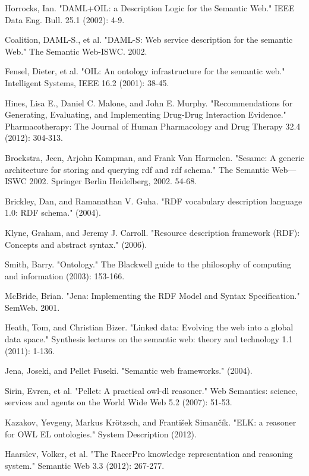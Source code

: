 \documentclass{article}
\begin{document}
\begin{thebibliography}{9}
  Horrocks, Ian. 
  "DAML+OIL: a Description Logic for the Semantic Web." 
  IEEE Data Eng. Bull. 25.1 
  (2002): 4-9.

  Coalition, DAML-S., et al. 
  "DAML-S: Web service description for the semantic Web." 
  The Semantic Web-ISWC. 2002.

  Fensel, Dieter, et al. 
  "OIL: An ontology infrastructure for the semantic web."
  Intelligent Systems, IEEE 16.2 
  (2001): 38-45.

  Hines, Lisa E., Daniel C. Malone, and John E. Murphy. "Recommendations for
  Generating, Evaluating, and Implementing Drug‐Drug Interaction Evidence."
  Pharmacotherapy: The Journal of Human Pharmacology and Drug Therapy 32.4
  (2012): 304-313.

Broekstra, Jeen, Arjohn Kampman, and Frank Van Harmelen. "Sesame: A generic
architecture for storing and querying rdf and rdf schema." The Semantic Web—ISWC
2002. Springer Berlin Heidelberg, 2002. 54-68.

  Brickley, Dan, and Ramanathan V. Guha. 
  "RDF vocabulary description language 1.0: RDF schema." 
  (2004).

  Klyne, Graham, and Jeremy J. Carroll. 
  "Resource description framework (RDF): Concepts and abstract syntax." 
  (2006).

  Smith, Barry. 
  "Ontology." 
  The Blackwell guide to the philosophy of computing and information 
  (2003): 153-166.

  McBride, Brian. 
  "Jena: Implementing the RDF Model and Syntax Specification."
  SemWeb. 
  2001.

  Heath, Tom, and Christian Bizer. 
  "Linked data: Evolving the web into a global data space." 
  Synthesis lectures on the semantic web: theory and technology 1.1
  (2011): 1-136.

  Jena, Joseki, and Pellet Fuseki. 
  "Semantic web frameworks." 
  (2004).

  Sirin, Evren, et al. "Pellet: A practical owl-dl reasoner." Web Semantics:
  science, services and agents on the World Wide Web 5.2 (2007): 51-53.

  Kazakov, Yevgeny, Markus Krötzsch, and František Simančík. "ELK: a reasoner
  for OWL EL ontologies." System Description (2012).

  Haarslev, Volker, et al. "The RacerPro knowledge representation and reasoning
  system." Semantic Web 3.3 (2012): 267-277.


\end{thebibliography}
\end{document}
